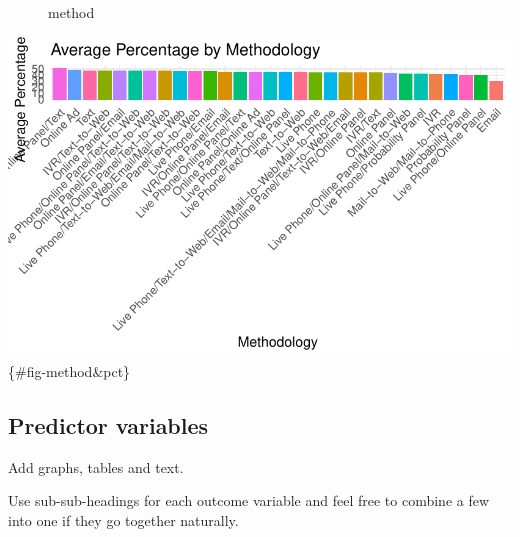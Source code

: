\documentclass[
  letterpaper,
  DIV=11,
  numbers=noendperiod]{scrartcl}
\begin{document}
\begin{figure}


\caption{\label{fig-method}method}

\end{figure}%

\includegraphics{paper_files/figure-pdf/fig-method&pct-1.pdf}\{\#fig-method\&pct\}

\subsection{Predictor variables}\label{predictor-variables}

Add graphs, tables and text.

Use sub-sub-headings for each outcome variable and feel free to combine
a few into one if they go together naturally.
\end{document}
